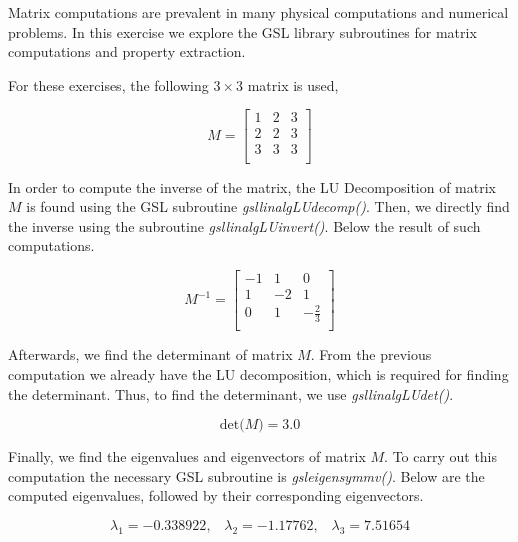 \documentclass{article}
\begin{document}
Matrix computations are prevalent in many physical computations and numerical problems. In this exercise we explore
the GSL library subroutines for matrix computations and property extraction.

For these exercises, the following $3 \times 3$ matrix is used,

\begin{equation}
 \label{eq:mat}
 M = \begin{bmatrix}
       1 & 2 & 3 \\[0.3em]
       2 & 2 & 3 \\[0.3em]
       3 & 3 & 3 \\[0.3em]
      \end{bmatrix}
\end{equation}

In order to compute the inverse of the matrix, the LU Decomposition of matrix $M$ is found using the GSL subroutine \textit{gsl\textunderscore linalg\textunderscore LU\textunderscore decomp()}. Then,
we directly find the inverse using the subroutine \textit{gsl\textunderscore linalg\textunderscore LU\textunderscore invert()}. Below the result of such computations.

$$
 M^{-1} = \begin{bmatrix}
       -1 & 1 & 0 \\[0.3em]
       1 & -2 & 1 \\[0.3em]
       0 & 1 &  -\frac{2}{3}\\[0.3em]
      \end{bmatrix}
$$

Afterwards, we find the determinant of matrix $M$. From the previous computation we already have the LU decomposition, which is required for finding the determinant. Thus, to find the determinant,
we use \textit{gsl\textunderscore linalg\textunderscore LU\textunderscore det()}.

$$
 \label{eq:mat}
 \text{det(}M\text{)} = 3.0
$$

Finally, we find the eigenvalues and eigenvectors of matrix $M$. To carry out this computation the necessary GSL subroutine is \textit{gsl\textunderscore eigen\textunderscore symmv()}. Below are the
computed eigenvalues, followed by their corresponding eigenvectors.

$$
\lambda_{1} = -0.338922 \text{,}\quad
\lambda_{2} = -1.17762 \text{,}\quad
\lambda_{3} = 7.51654
$$
\end{document}
